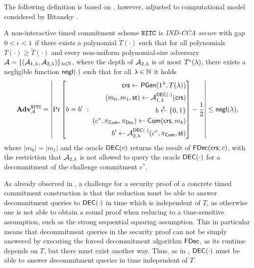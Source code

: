 The following definition is based on \cite{TCC:KatLosXu20}, however, adjusted to computational model considered by Bitansky \etal \cite{ITCS:BGJPVW16}. 
\begin{definition}
\label{def:nitc_cca}
A non-interactive timed commitment scheme $\mathtt{NITC}$ is \emph{IND-CCA secure} with gap $0 < \epsilon < 1$ if there exists a polynomial $\tilde{T}(\cdot)$ such that for all polynomials $T(\cdot) \geq \tilde{T}(\cdot)$ and every non-uniform polynomial-size adversary $\mathcal{A} = \{(\mathcal{A}_{1,\lambda}, \mathcal{A}_{2, \lambda})\}_{\lambda \in \mathbb{N}}$, where the depth of $\mathcal{A}_{2, \lambda}$ is at most $T^{\epsilon}(\lambda)$, there exists a negligible function $\mathsf{negl}(\cdot)$ such that for all $\lambda \in \mathbb{N}$ it holds 
\[ \mathbf{Adv}^{\mathtt{NITC}}_{\mathcal{A}} = 
\left| \Pr\left[ 
    b = b'
    \;:\;
    \begin{aligned}
    \mathsf{crs} \leftarrow \mathsf{PGen}(1{^{\lambda}}, T(\lambda)) \\
      (m_0, m_1, \mathsf{st}) \leftarrow \mathcal{A}_{1,\lambda}^{\mathsf{DEC}(\cdot)}(\mathsf{crs}) \\
      b \stackrel{{\scriptscriptstyle\$}}{\leftarrow} \{0,1\}\\
      (c^*, \pi_{\mathsf{Com}}, \pi_{\mathsf{Dec}}) \leftarrow \mathsf{Com}(\mathsf{crs}, m_b) \\
      b' \leftarrow \mathcal{A}_{2,\lambda}^{\mathsf{DEC}(\cdot)}(c^*, \pi_{\mathsf{Com}}, \mathsf{st})
    \end{aligned}
    \right] -  \frac{1}{2} \right|
\leq \mathsf{negl}(\lambda),  
\]
where $|m_0|=|m_1|$ and the oracle ${\mathsf{DEC}(c)}$ returns the result of $\mathsf{FDec}(\mathsf{crs}, c)$, with the restriction that $\mathcal{A}_{2, \lambda}$ is not allowed to query the oracle $\mathsf{DEC}(\cdot)$ for a decommitment of the challenge commitment $c^*$. %
\end{definition}

As already observed in \cite{TCC:KatLosXu20}, a challenge for a security proof of a concrete timed commitment construction is that the reduction must be able to answer decommitment queries to $\mathsf{DEC}(\cdot)$ in time which is independent of $T$, as otherwise one is not able to obtain a sound proof when reducing to a time-sensitive assumption, such as the strong sequential squaring assumption. This in particular means that decommitment queries in the security proof can not be simply answered by executing the forced decommitment algorithm $\mathsf{FDec}$, as its runtime depends on $T$, but there must exist another way.  Thus, as in \cite{TCC:KatLosXu20}, $\mathsf{DEC}(\cdot)$ must be able to answer decommitment queries in time independent of $T$. 

